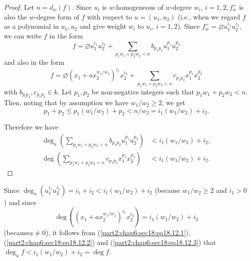 \begin{proof}
  Let $n= d_w (f)$. Since $u_i$ is $w$-homogeneous of $w$-degree
  $w_i$, $i=1, 2, f_w^+$ is also the $w$-degree form of $f$ with
  respect to $u= (u_1, u_2)$ (i.e., when we regard $f$ as a polynomial
  in $u_1, u_2$ and give weight $w_i$ to $u_i$, $i=1, 2$). Since
  $f_w^+= \diameter u_1^{i_1} u_2^{i_2}$, we can write $f$ in the form
\begin{equation*}
  f= \diameter u_1^{i_1} u_2^{i_2}+ \sum_{p_1 w_1 + p_2 w_2 < n}
  b_{p_1 p_2} u_1^{p_1} u_2^{p_2}
  \tag{18.12.1}\label{part2:chap6:sec18:eq18.12.1} 
\end{equation*}
and also in the form
\begin{equation*}
  f= \diameter (x_1 + ax_2^{w_1/w_2})^{i_1} x_2^{i_2} + \sum_{p_1 w_1 +
  p_2w_2< n} c_{p_1 p_2} x_1^{p_1} x_2^{p_2}
  \tag{18.12.2}\label{part2:chap6:sec18:eq18.12.2} 
\end{equation*}
with $b_{p_! p_2}, c_{p_1 p_2} \in k$. Let $p_1, p_2$ be non-negative
integers such that  $p_1 w_1 + p_2 w_2 < n$. Then, noting that by
assumption we have $w_1/w_2 \geq 2$, we get 
$$
p_1 + p_2 \leq p_1 (w_1/w_2)+ p_2 < n/w_2 = i_1 (w_1/w_2)+ i_2.
$$

Therefore we have
\begin{equation*}
  \begin{aligned}
    \deg_u  \left( \sum_{p_1 w_1 + p_2 w_2< n} b_{p_1 p_2} u_1^{p_1}
    u_2^{p_2} \right) & < i_1 (w_1/w_2) + i_2,\\
    \deg \left( \sum_{p_1 w_1 + p_2 w_2 < n} c_{p_1 p_2} x_1^{p_1}
    x_2^{p_2}\right) & < i_1 (w_1 /w_2)+ i_2.
  \end{aligned}  \tag{18.12.3}\label{part2:chap6:sec18:eq18.12.3} 
\end{equation*}
\end{proof}

Since $\deg_u \left( u_1^{i_1} u_2^{i_2}\right)= i_1 + i_2 < i_1 (w_1
/ w_2)+ i_2$ (because $w_1/w_2\geq 2$ and $i_1> 0$) and since
$$
\deg \left( \left( x_1 + ax_2^{w_1/w_2} \right)^{i_1} x_2^{i_2}\right)
= i_1 (w_1/ w_2)+ i_2
$$
(because\pageoriginale $a\neq 0$), it follows from
(\ref{part2:chap6:sec18:eq18.12.1}),
(\ref{part2:chap6:sec18:eq18.12.2}) and
(\ref{part2:chap6:sec18:eq18.12.3}) that $\deg_u f< i_1 (w_1/w_2) +
i_2= \deg f$.

